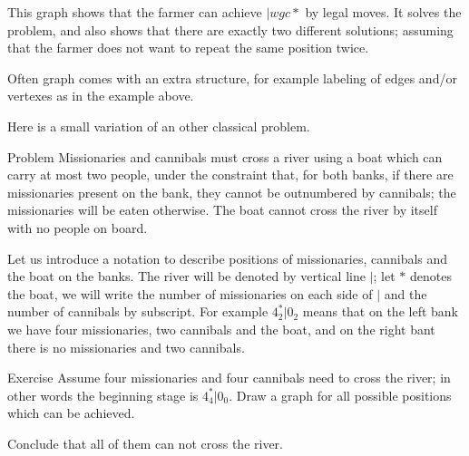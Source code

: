 \begin{center}
\end{center}

This graph shows that the farmer can achieve ${}|{wgc{*}}$ by legal moves.
It solves the problem, and also shows that there are exactly two different solutions;
assuming that the farmer does not want to repeat the same position twice. 
\qeds

Often graph comes with an extra structure, for example labeling of edges and/or vertexes as in the example above.

Here is a small variation of an other classical problem.

\begin{thm}{Problem} Missionaries and cannibals must cross a river using a boat which can carry at most two people, under the constraint that, for both banks, if there are missionaries present on the bank, they cannot be outnumbered by cannibals; the missionaries will be eaten otherwise.
The boat cannot cross the river by itself with no people on board.
\end{thm}

Let us introduce a notation to describe positions of missionaries, cannibals and the boat on the banks.
The river will be denoted by vertical line $|$;
let $*$ denotes the boat, we will write the number of missionaries on each side of $|$ and the number of cannibals by subscript. For example $4_2^*|0_2$ means that on the left bank we have four missionaries, two cannibals and the boat, and on the right bant there is no missionaries and two cannibals.

\begin{thm}{Exercise}
Assume four missionaries and four cannibals need to cross the river; in other words the beginning stage is $4_4^*|0_0$.
Draw a graph for all possible positions which can be achieved.

Conclude that all of them can not cross the river.
\end{thm}

